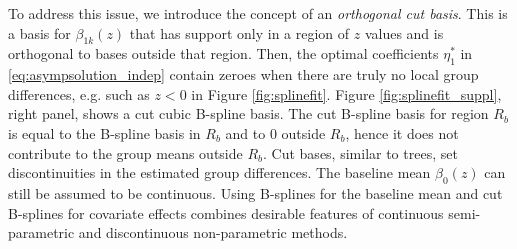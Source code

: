 To address this issue, we introduce the concept of an \emph{orthogonal cut basis}. This is a basis for $\beta_{1k}(z)$ that has support only in a region of $z$ values and is orthogonal to bases outside that region.
Then, the optimal coefficients $\eta_{1}^*$ in \eqref{eq:asympsolution_indep}  contain zeroes when there are truly no local group differences, e.g. such as $z < 0$ in Figure \ref{fig:splinefit}. 
Figure \ref{fig:splinefit_suppl}, right panel, shows a cut cubic B-spline basis. 
The cut B-spline basis for region $R_b$ is equal to the B-spline basis in $R_b$ and to 0 outside $R_b$, hence it does not contribute to the group means outside $R_b$. 
Cut bases, similar to trees, set discontinuities in the estimated group differences. The baseline mean $\beta_0(z)$ can still be assumed to be continuous. Using B-splines for the baseline mean and cut B-splines for covariate effects combines desirable features of continuous semi-parametric and discontinuous non-parametric methods.

